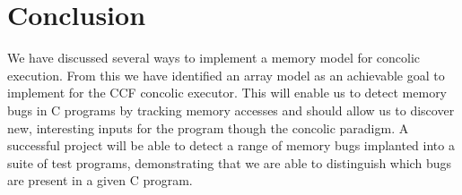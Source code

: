 \documentclass[12pt,twoside]{report}
\begin{document}


\chapter{Conclusion}
We have discussed several ways to implement a memory model for concolic execution. From this we have identified an array model as an achievable goal to implement for the CCF concolic executor. This will enable us to detect memory bugs in C programs by tracking memory accesses and should allow us to discover new, interesting inputs for the program though the concolic paradigm. A successful project will be able to detect a range of memory bugs implanted into a suite of test programs, demonstrating that we are able to distinguish which bugs are present in a given C program.




\end{document}
